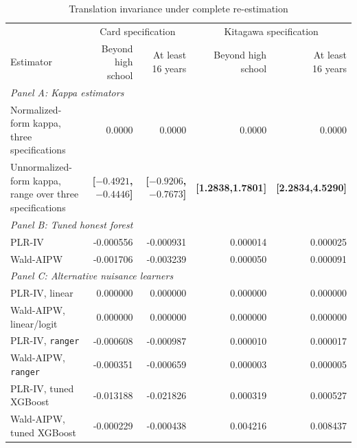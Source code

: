 \documentclass[12pt, a4paper, oneside]{article}
\theoremstyle{plain}
\theoremstyle{definition}
\begin{document}
\begin{table}[H]
\centering
\caption{Translation invariance under complete re-estimation}
\label{tab:card_translation}
\footnotesize
\setlength{\tabcolsep}{3pt}
\begin{threeparttable}
\begin{tabular}{@{}lrrrr@{}}
\toprule
& \multicolumn{2}{c}{Card specification}
& \multicolumn{2}{c}{Kitagawa specification} \\
\cmidrule(lr){2-3}\cmidrule(lr){4-5}
Estimator
& \shortstack{Beyond high\\school}
& \shortstack{At least\\16 years}
& \shortstack{Beyond high\\school}
& \shortstack{At least\\16 years} \\
\midrule

\multicolumn{5}{l}{\textit{Panel A: Kappa estimators}} \\[2pt]

\shortstack[l]{Normalized-form kappa,\\three specifications}
& 0.0000 & 0.0000 & 0.0000 & 0.0000 \\

\shortstack[l]{Unnormalized-form kappa,\\range over three specifications}
& \textbf{[$-0.4921$,$-0.4446$]}
& \textbf{[$-0.9206$,$-0.7673$]}
& \textbf{[1.2838,1.7801]}
& \textbf{[2.2834,4.5290]} \\[4pt]

\multicolumn{5}{l}{\textit{Panel B: Tuned honest forest}} \\[2pt]
PLR-IV
& -0.000556 & -0.000931 & 0.000014 & 0.000025 \\
Wald-AIPW
& -0.001706 & -0.003239 & 0.000050 & 0.000091 \\[4pt]

\multicolumn{5}{l}{\textit{Panel C: Alternative nuisance learners}} \\[2pt]
PLR-IV, linear
& 0.000000 & 0.000000 & 0.000000 & 0.000000 \\
Wald-AIPW, linear/logit
& 0.000000 & 0.000000 & 0.000000 & 0.000000 \\
PLR-IV, \texttt{ranger}
& -0.000608 & -0.000987 & 0.000010 & 0.000017 \\
Wald-AIPW, \texttt{ranger}
& -0.000351 & -0.000659 & 0.000003 & 0.000005 \\
PLR-IV, tuned XGBoost
& -0.013188 & -0.021826 & 0.000319 & 0.000527 \\
Wald-AIPW, tuned XGBoost
& -0.000229 & -0.000438 & 0.004216 & 0.008437 \\


\end{tabular}
\end{threeparttable}
\end{table}
\end{document}
